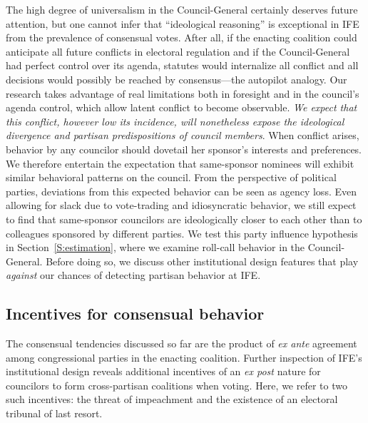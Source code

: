 \documentclass[12 pt, letter]{article}
\begin{document}
The high degree of universalism in the Council-General certainly deserves future attention, but one cannot infer that ``ideological reasoning'' is exceptional in IFE from the prevalence of consensual votes. After all, if the enacting coalition could anticipate all future conflicts in electoral regulation and if the Council-General had perfect control over its agenda, statutes would internalize all conflict and all decisions would possibly be reached by consensus---the autopilot analogy. Our research takes advantage of real limitations both in foresight and in the council's agenda control, which allow latent conflict to become observable. \emph{We expect that this conflict, however low its incidence, will nonetheless expose the ideological divergence and partisan predispositions of council members}.  When conflict arises, behavior by any councilor should dovetail her sponsor's interests and preferences. We therefore entertain the expectation that same-sponsor nominees will exhibit similar behavioral patterns on the council. From the perspective of political parties, deviations from this expected behavior can be seen as agency loss. Even allowing for slack due to vote-trading and idiosyncratic behavior, we still expect to find that same-sponsor councilors are ideologically closer to each other than to colleagues sponsored by different parties.  We test this party influence hypothesis in Section~\ref{S:estimation}, where we examine roll-call behavior in the Council-General.  Before doing so, we discuss other institutional design features that play \emph{against} our chances of detecting partisan behavior at IFE.

\subsection{Incentives for consensual behavior}
The consensual tendencies discussed so far are the product of \emph{ex ante} agreement among congressional parties in the enacting coalition.  Further inspection of IFE's institutional design reveals additional incentives of an \emph{ex post} nature for councilors to form cross-partisan coalitions when voting.  Here, we refer to two such incentives: the threat of impeachment and the existence of an electoral tribunal of last resort.
\end{document}
